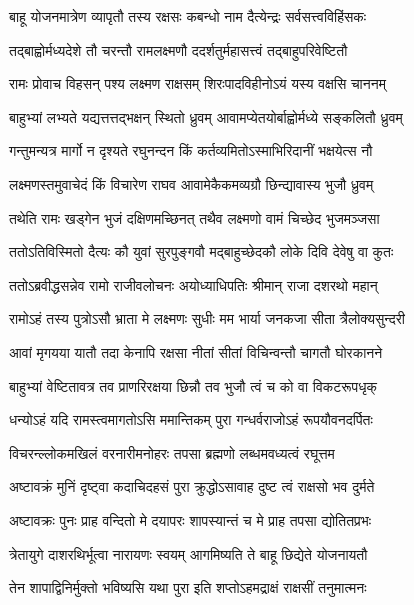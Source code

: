 \twolineshloka
{बाहू योजनमात्रेण व्यापृतौ तस्य रक्षसः}
{कबन्धो नाम दैत्येन्द्रः सर्वसत्त्वविहिंसकः} %

\twolineshloka
{तद्बाह्वोर्मध्यदेशे तौ चरन्तौ रामलक्ष्मणौ}
{ददर्शतुर्महासत्त्वं तद्बाहुपरिवेष्टितौ} %

\twolineshloka
{रामः प्रोवाच विहसन् पश्य लक्ष्मण राक्षसम्}
{शिरःपादविहीनोऽयं यस्य वक्षसि चाननम्} %

\twolineshloka
{बाहुभ्यां लभ्यते यद्यत्तत्तद्भक्षन् स्थितो ध्रुवम्}
{आवामप्येतयोर्बाह्वोर्मध्ये सङ्कलितौ ध्रुवम्} %

\twolineshloka
{गन्तुमन्यत्र मार्गो न दृश्यते रघुनन्दन}
{किं कर्तव्यमितोऽस्माभिरिदानीं भक्षयेत्स नौ} %

\twolineshloka
{लक्ष्मणस्तमुवाचेदं किं विचारेण राघव}
{आवामेकैकमव्यग्रौ छिन्द्यावास्य भुजौ ध्रुवम्} %

\twolineshloka
{तथेति रामः खड्गेन भुजं दक्षिणमच्छिनत्}
{तथैव लक्ष्मणो वामं चिच्छेद भुजमञ्जसा} %

\twolineshloka
{ततोऽतिविस्मितो दैत्यः कौ युवां सुरपुङ्गवौ}
{मद्बाहुच्छेदकौ लोके दिवि देवेषु वा कुतः} %

\twolineshloka
{ततोऽब्रवीद्धसन्नेव रामो राजीवलोचनः}
{अयोध्याधिपतिः श्रीमान् राजा दशरथो महान्} %

\twolineshloka
{रामोऽहं तस्य पुत्रोऽसौ भ्राता मे लक्ष्मणः सुधीः}
{मम भार्या जनकजा सीता त्रैलोक्यसुन्दरी} %

\twolineshloka
{आवां मृगयया यातौ तदा केनापि रक्षसा}
{नीतां सीतां विचिन्वन्तौ चागतौ घोरकानने} %

\twolineshloka
{बाहुभ्यां वेष्टितावत्र तव प्राणरिरक्षया}
{छिन्नौ तव भुजौ त्वं च को वा विकटरूपधृक्} %


\twolineshloka
{धन्योऽहं यदि रामस्त्वमागतोऽसि ममान्तिकम्}
{पुरा गन्धर्वराजोऽहं रूपयौवनदर्पितः} %

\twolineshloka
{विचरन्ल्लोकमखिलं वरनारीमनोहरः}
{तपसा ब्रह्मणो लब्धमवध्यत्वं रघूत्तम} %

\twolineshloka
{अष्टावक्रं मुनिं दृष्ट्वा कदाचिदहसं पुरा}
{क्रुद्धोऽसावाह दुष्ट त्वं राक्षसो भव दुर्मते} %

\twolineshloka
{अष्टावक्रः पुनः प्राह वन्दितो मे दयापरः}
{शापस्यान्तं च मे प्राह तपसा द्योतितप्रभः} %

\twolineshloka
{त्रेतायुगे दाशरथिर्भूत्वा नारायणः स्वयम्}
{आगमिष्यति ते बाहू छिद्येते योजनायतौ} %

\twolineshloka
{तेन शापाद्विनिर्मुक्तो भविष्यसि यथा पुरा}
{इति शप्तोऽहमद्राक्षं राक्षसीं तनुमात्मनः} %

